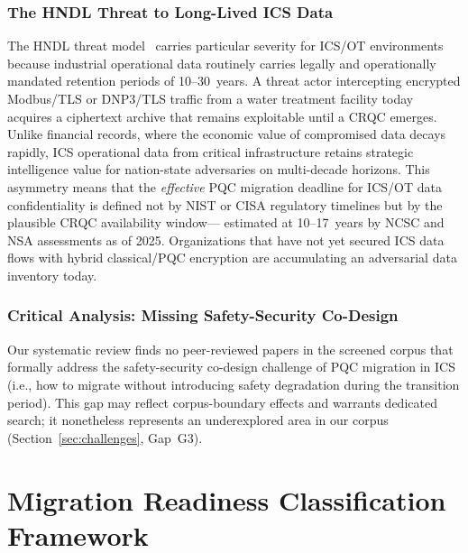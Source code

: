 \documentclass[journal]{IEEEtran}
\begin{document}
\subsubsection{The HNDL Threat to Long-Lived ICS Data}

The HNDL threat model~\cite{mosca2018cybersecurity} carries particular
severity for ICS/OT environments because industrial operational data
routinely carries legally and operationally mandated retention periods of
10--30~years. A threat actor intercepting encrypted Modbus/TLS or
DNP3/TLS traffic from a water treatment facility today acquires a
ciphertext archive that remains exploitable until a CRQC emerges. Unlike
financial records, where the economic value of compromised data decays
rapidly, ICS operational data from critical infrastructure retains
strategic intelligence value for nation-state adversaries on multi-decade
horizons. This asymmetry means that the \emph{effective} PQC migration
deadline for ICS/OT data confidentiality is defined not by NIST or CISA
regulatory timelines but by the plausible CRQC availability window---
estimated at 10--17~years by NCSC and NSA assessments as of 2025.
Organizations that have not yet secured ICS data flows with hybrid
classical/PQC encryption are accumulating an adversarial data inventory
today.

\subsubsection{Critical Analysis: Missing Safety-Security Co-Design}

Our systematic review finds no peer-reviewed papers in the screened corpus that
formally address the safety-security co-design challenge of PQC migration in
ICS (i.e., how to migrate without introducing safety degradation during the
transition period). This gap may reflect corpus-boundary effects and warrants
dedicated search; it nonetheless represents an underexplored area in our corpus
(Section~\ref{sec:challenges}, Gap~G3).

\FloatBarrier
\section{Migration Readiness Classification Framework}
\label{sec:mrc}
\end{document}
